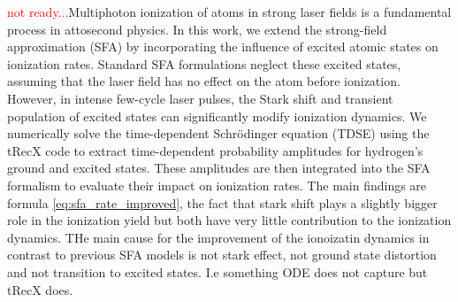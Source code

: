 \textcolor{red}{not ready...}Multiphoton ionization of atoms in strong laser fields is a fundamental process in attosecond physics. In this work, we extend the strong-field approximation (SFA) by incorporating the influence of excited atomic states on ionization rates. Standard SFA formulations neglect these excited states, assuming that the laser field has no effect on the atom before ionization. However, in intense few-cycle laser pulses, the Stark shift and transient population of excited states can significantly modify ionization dynamics. We numerically solve the time-dependent Schrödinger equation (TDSE) using the tRecX code to extract time-dependent probability amplitudes for hydrogen’s ground and excited states. These amplitudes are then integrated into the SFA formalism to evaluate their impact on ionization rates. 
The main findings are formula \eqref{eq:sfa_rate_improved}, the fact that stark shift plays a slightly bigger role in the ionization yield but both have very little contribution to the ionization dynamics. THe main cause for the improvement of the ionoizatin dynamics in contrast to previous SFA models is not stark effect, not ground state distortion and not transition to excited states. I.e something ODE does not capture but tRecX does.
